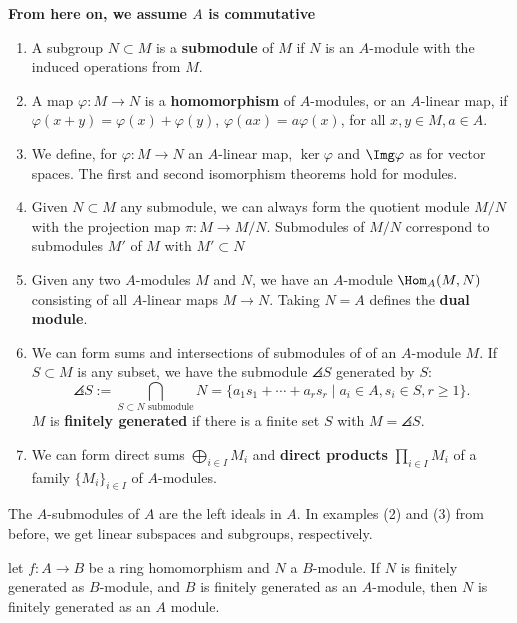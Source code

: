 \textbf{From here on, we assume $A$ is commutative}

\begin{defn}
    \begin{enumerate}
        \item A subgroup $N \subset M$ is a \textbf{submodule} of $M$ if $N$ is an $A$-module with the induced operations from $M$.
        \item A map $\varphi: M \to N$ is a \textbf{homomorphism} of $A$-modules, or an $A$-linear map, if $\varphi(x+y)=\varphi(x)+\varphi(y)$, $\varphi(ax)=a\varphi(x)$, for all $x,y \in M, a \in A$.
        \item We define, for $\varphi :M \to N$ an $A$-linear map, $\ker \varphi$ and $\Img \varphi$ as for vector spaces. The first and second isomorphism theorems hold for modules.
        \item Given $N \subset M$ any submodule, we can always form the quotient module $M / N$ with the projection map $\pi : M \to M/N$. Submodules of $M/N$ correspond to submodules $M'$ of $M$ with $M' \subset N$
        \item Given any two $A$-modules $M$ and $N$, we have an $A$-module $\Hom _A(M,N)$ consisting of all $A$-linear maps $M \to N$. Taking $N=A$ defines the \textbf{dual module}.
        \item We can form sums and intersections of submodules of of an $A$-module $M$. If $S \subset M$ is any subset, we have the submodule $\angles{S}$ generated by $S$:
        $$\angles{S}:= \bigcap_{S \subset N\text{ submodule}}N= \{a_1s_1+\cdots + a_rs_r \mid a_i\in A,s_i \in S, r \geq 1\}.$$
        $M$ is \textbf{finitely generated} if there is a finite set $S$ with $M = \angles{S}$.
        \item We can form direct sums $ \bigoplus _{i \in I}M_i$ and \textbf{direct products} $\prod _{i \in I}M_i$ of a family $\{M_i\}_{i \in I}$ of $A$-modules.
    \end{enumerate}
\end{defn}

\begin{ex}
    The $A$-submodules of $A$ are the left ideals in $A$. In examples (2) and (3) from before, we get linear subspaces and subgroups, respectively.
\end{ex}

\begin{notebox*}[Exercise]
    let $f:A \to B$ be a ring homomorphism and $N$ a $B$-module. If $N$ is finitely generated as $B$-module, and $B$ is finitely generated as an $A$-module, then $N$ is finitely generated as an $A$ module.
\end{notebox*}

